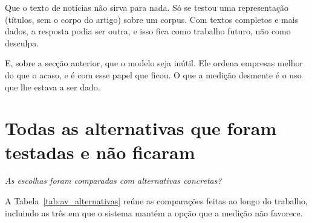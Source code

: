 Que o texto de notícias não sirva para nada. Só se testou uma representação (títulos, sem o corpo
do artigo) sobre um corpus. Com textos completos e mais dados, a resposta podia ser outra, e isso
fica como trabalho futuro, não como desculpa.

E, sobre a secção anterior, que o modelo seja inútil. Ele ordena empresas melhor do que o acaso, e é
com esse papel que ficou. O que a medição desmente é o uso que lhe estava a ser dado.

\section{Todas as alternativas que foram testadas e não ficaram}
\label{sec:av_alternativas}

\emph{As escolhas foram comparadas com alternativas concretas?}

A Tabela~\ref{tab:av_alternativas} reúne as comparações feitas ao longo do trabalho, incluindo as
três em que o sistema mantém a opção que a medição não favorece.

